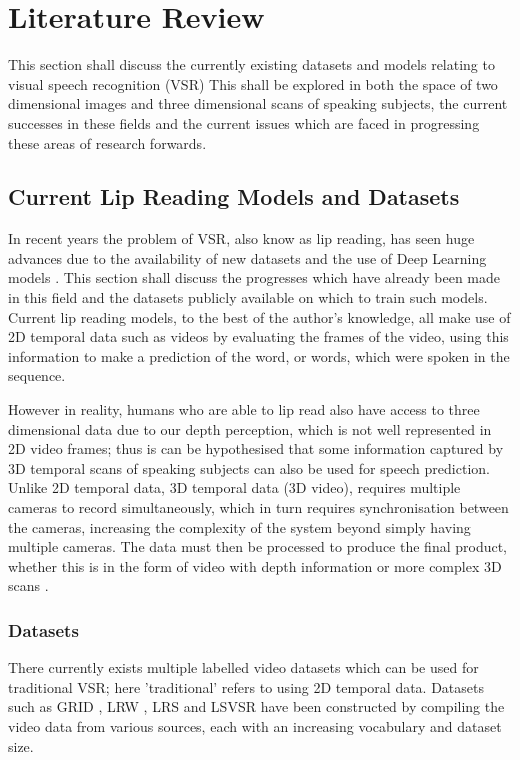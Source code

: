 \documentclass[12pt]{report}
\begin{document}
\chapter{Literature Review}

This section shall discuss the currently existing datasets and models relating to visual speech recognition (VSR)
This shall be explored in both the space of two dimensional images and three dimensional scans of speaking subjects, the current successes in these fields and the current issues which are faced in progressing these areas of research forwards.

\section{Current Lip Reading Models and Datasets}

In recent years the problem of VSR, also know as lip reading, has seen huge advances due to the availability of new datasets and the use of Deep Learning models \cite{Chung2016, Chung2017, Shillingford2018}.
This section shall discuss the progresses which have already been made in this field and the datasets publicly available on which to train such models.
Current lip reading models, to the best of the author's knowledge, all make use of 2D temporal data such as videos by evaluating the frames of the video, using this information to make a prediction of the word, or words, which were spoken in the sequence.

However in reality, humans who are able to lip read also have access to three dimensional data due to our depth perception, which is not well represented in 2D video frames; thus is can be hypothesised that some information captured by 3D temporal scans of speaking subjects can also be used for speech prediction.
Unlike 2D temporal data, 3D temporal data (3D video), requires multiple cameras to record simultaneously, which in turn requires synchronisation between the cameras, increasing the complexity of the system beyond simply having multiple cameras.
The data must then be processed to produce the final product, whether this is in the form of video with depth information or more complex 3D scans \cite{Li2017}.

\subsection{Datasets}
There currently exists multiple labelled video datasets which can be used for traditional VSR; here 'traditional' refers to using 2D temporal data.
Datasets such as GRID \cite{Cooke2006}, LRW \cite{Chung2016}, LRS \cite{Chung2017} and LSVSR \cite{Shillingford2018} have been constructed by compiling the video data from various sources, each with an increasing vocabulary and dataset size.
\end{document}
